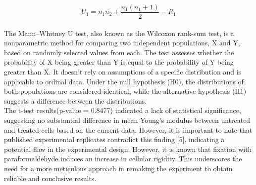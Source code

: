 \documentclass[a4paper,english,12pt,bibliography=totoc]{scrreprt}
\begin{document}
\[U_1 = n_1n_2 + \frac{n_1(n_1 + 1)}{2} - R_1\] 
\\
The Mann–Whitney U test, also known as the Wilcoxon rank-sum test, is a nonparametric method for comparing two independent populations, X and Y, based on randomly selected values from each. The test assesses whether the probability of X being greater than Y is equal to the probability of Y being greater than X. It doesn't rely on assumptions of a specific distribution and is applicable to ordinal data. Under the null hypothesis (H0), the distributions of both populations are considered identical, while the alternative hypothesis (H1) suggests a difference between the distributions.
\\
The t-test results(p-value = 0.8477) indicated a lack of statistical significance, suggesting no substantial difference in mean Young's modulus between untreated and treated cells based on the current data. However, it is important to note that published experimental replicates contradict this finding [5], indicating a potential flaw in the experimental design. However, it is known that fixation with paraformaldehyde induces an increase in cellular rigidity. This underscores the need for a more meticulous approach in remaking the experiment to obtain reliable and conclusive results.
\\
\end{document}
